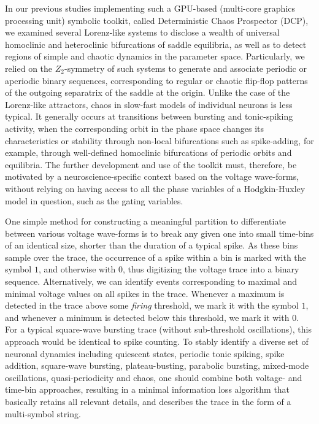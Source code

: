 \documentclass{ws-book9x6}
\begin{document}
In our previous studies implementing such a GPU-based (multi-core graphics processing unit)  symbolic toolkit, called Deterministic Chaos Prospector (DCP), we examined several  Lorenz-like systems \citep{pusuluri2017, pusuluri2018} to disclose a wealth of universal homoclinic and heteroclinic bifurcations of saddle equilibria, as well as to detect regions of simple and chaotic dynamics in the parameter space. Particularly, we relied on the $Z_2$-symmetry of such systems to generate and associate periodic or aperiodic binary sequences, corresponding to regular or chaotic flip-flop patterns of the  outgoing separatrix of the saddle at the origin. Unlike the case of the Lorenz-like attractors, chaos in slow-fast models of individual neurons is less typical. It generally occurs at transitions between bursting and tonic-spiking activity, when the corresponding orbit in the phase space changes its characteristics or stability through non-local bifurcations such as spike-adding, for example, through well-defined homoclinic bifurcations of periodic orbits and equilibria. The further development and use of the toolkit must, therefore, be motivated by a neuroscience-specific context based on the voltage wave-forms, without relying on having access to all the phase variables of a Hodgkin-Huxley model in question, such as the gating variables.     

One simple method for constructing a meaningful partition to differentiate between various voltage wave-forms is to break any given one into small time-bins of an identical size, shorter than the duration of a typical spike. As these bins sample over the trace, the occurrence of a spike within a bin is marked with the symbol $1$, and otherwise with $0$, thus digitizing the voltage trace into a binary sequence. Alternatively, we can identify events corresponding to maximal and minimal voltage values on all spikes in the trace. Whenever a maximum is detected in the trace above some {\em firing} threshold, we mark it with the symbol $1$, and whenever a minimum is detected below this threshold, we mark it with $0$. For a typical square-wave bursting trace (without sub-threshold oscillations), this approach would be identical to spike counting.  To stably identify a diverse set of neuronal dynamics including quiescent states, periodic tonic spiking, spike addition, square-wave bursting, plateau-busting, parabolic bursting, mixed-mode oscillations, quasi-periodicity and chaos, one should combine both voltage- and time-bin approaches, resulting in a minimal information loss algorithm that basically retains all relevant details, and describes the trace in the form of a multi-symbol string. 
\end{document}
